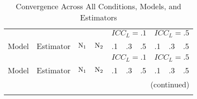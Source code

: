 {
 \singlespacing
\begin{longtable}[!tbp]{@{\extracolsep{\fill}}lccccccccc}
\caption[Convergence Across All Conditions, Models, and Estimators]{Convergence Across All Conditions, Models, and Estimators} \label{tb:con-all} \\

   \toprule
   	& &	&		 &	\multicolumn{3}{c}{${ICC}_L = .1$} & \multicolumn{3}{c}{${ICC}_L = .5$} \\ \cmidrule(lr){5-7} \cmidrule(lr){8-10}
Model & Estimator & $\rm N_1$ & $\rm N_2$ & .1 & .3 & .5 & .1 & .3 & .5 \\ 
  \midrule
\endfirsthead

\toprule
   	& &	&		 &	\multicolumn{3}{c}{${ICC}_L = .1$} & \multicolumn{3}{c}{${ICC}_L = .5$} \\ \cmidrule(lr){5-7} \cmidrule(lr){8-10}
Model & Estimator & $\rm N_1$ & $\rm N_2$ & .1 & .3 & .5 & .1 & .3 & .5 \\ 
  \midrule
\endhead

\multicolumn{10}{r}{{(continued)}} \\  %
\endfoot


\end{longtable}}
